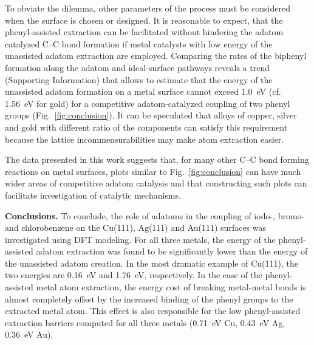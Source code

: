 \documentclass[aps,prb,amsmath,amssymb,11pt]{revtex4-1}
\newcommand{\sinfo}{Supporting Information}
\newcommand{\zhzh}{\color{black}}
\renewcommand{\sout}[1]{\unskip}
\begin{document}
To obviate the dilemma, other parameters of the process must be considered when the surface is chosen or designed. It is reasonable to expect, that the phenyl-assisted extraction can be facilitated without hindering the adatom catalyzed C--C bond formation if metal catalysts with low energy of the unassisted adatom extraction are employed. 
%
Comparing the rates of the biphenyl formation along the adatom and ideal-surface pathways reveals a trend (\sinfo) that allows to estimate that the energy of \sout{the adatom extraction on a clean} {\zhzh the unassisted adatom formation on a} metal surface cannot exceed \SI{1.0}{\electronvolt} (cf. \SI{1.56}{\electronvolt} for gold) for a competitive adatom-catalyzed coupling of two phenyl groups (Fig.~\ref{fig:conclusion}).
It can be speculated that alloys of copper, silver and gold with different ratio of the components can satisfy this requirement because the lattice incommensurabilities may make atom extraction easier. 


The data presented in this work suggests that, for many other C--C bond forming reactions on metal surfaces, plots similar to Fig.~\ref{fig:conclusion} can have much wider areas of competitive adatom catalysis and that constructing such plots can facilitate investigation of catalytic mechanisms. 


{\zhzh \textbf{Conclusions.}} To conclude, the role of adatoms in the coupling of iodo-, bromo- and chlorobenzene on the Cu(111), Ag(111) and Au(111) surfaces was investigated using DFT modeling. For all three metals, \sout{it was found that} the energy of the phenyl-assisted adatom extraction \sout{is} {\zhzh was found to be} significantly lower than the energy of the \sout{clean-surface} unassisted adatom creation. In the most dramatic example of Cu(111), the two energies are \SI{0.16}{\electronvolt} and \SI{1.76}{\electronvolt}, respectively. In the case of the phenyl-assisted metal atom extraction, the energy cost of breaking metal-metal bonds is almost completely offset by the increased binding of the phenyl groups to the extracted metal atom. This effect is also responsible for the low phenyl-assisted extraction barriers computed for all three metals (\SI{0.71}{\electronvolt} Cu, \SI{0.43}{\electronvolt} Ag, \SI{0.36}{\electronvolt} Au). 
\end{document}
